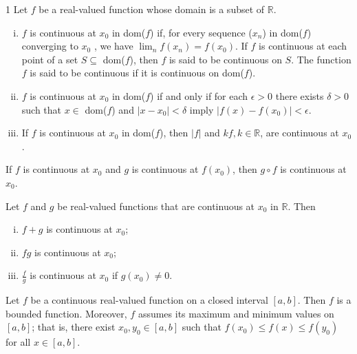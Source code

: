 \begin{defn}{1}
	Let $f$ be a real-valued function whose domain is a subset of $\mathbb{R}$.
	\begin{enumerate}[(i)]
		\item $f$ is continuous at $x_0$ in dom($f$) if, for every sequence ($x_n$)
		in dom($f$) converging to $x_0$ , we have $\lim_n f (x_n) = f(x_0)$. If $f$ is
		continuous at each point of a set $S \subseteq $ dom($f$), then $f$ is said to
		be continuous on $S$. The function $f$ is said to be continuous if it is continuous on dom($f$).
		\item $f$ is continuous at $x_0$ in dom($f$) if and only if for each $\epsilon > 0$ there exists $\delta >0$ such that $x\in$ dom($f$) and $|x-x_0|<\delta$ imply $|f(x)-f(x_0)|<\epsilon$.
		\item If $f$ is continuous
		at $x_0$ in dom($f$), then $|f|$ and $kf , k \in\mathbb{R}$, are continuous at $x_0$.
	\end{enumerate}
\end{defn}

\begin{theo}{1}
	If $f$ is continuous at $x_0$ and $g$ is continuous at $f(x_0)$, then $g \circ f$ is continuous at $x_0$.
\end{theo}

\newpage

\begin{theo}{1}
	Let $f$ and $g$ be real-valued functions that are continuous at $x_0$ in $\mathbb{R}$. Then
	\begin{enumerate}[(i)]
		\item $f+g$ is continuous at $x_0$;
		\item $fg$ is continuous at $x_0$;
		\item $\frac{f}{g}$ is continuous at $x_0$ if $g(x_0) \neq 0$.
	\end{enumerate}
\end{theo}

\begin{theo}{1}
	Let $f$ be a continuous real-valued function on a closed interval $[a, b]$.
	Then $f$ is a bounded function. Moreover, $f$ assumes its maximum and minimum values on $[a, b]$; that is, there exist $x_0, y_0 \in [a, b]$ such that $f(x_0) \leq f(x) \leq f(y_0)$ for all $x \in [a, b]$.
\end{theo}

